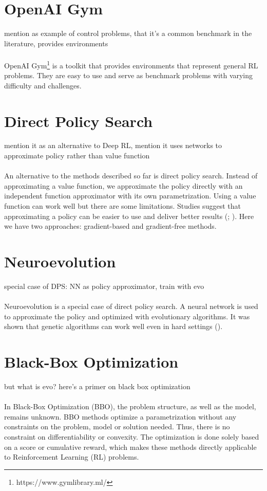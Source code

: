\section{OpenAI Gym}
\label{sec:gym}
mention as example of control problems, that it's a common benchmark in the literature, provides environments \\ \\
OpenAI Gym\footnote{https://www.gymlibrary.ml/} is a toolkit that provides environments that represent general RL problems. They are easy to use and serve as benchmark problems with varying difficulty and challenges.

\section{Direct Policy Search}
mention it as an alternative to Deep RL, mention it uses networks to approximate policy rather than value function \\ \\
An alternative to the methods described so far is direct policy search. Instead of approximating a value function, we approximate the policy directly with an independent function approximator with its own parametrization. Using a value function can work well but there are some limitations. Studies suggest that approximating a policy can be easier to use and deliver better results (\cite{sutton1999policy}; \cite{anderson2000approximating}).
Here we have two approaches: gradient-based and gradient-free methods.

\section{Neuroevolution}
special case of DPS: NN as policy approximator, train with evo \\ \\
Neuroevolution is a special case of direct policy search. A neural network is used to approximate the policy and optimized with evolutionary algorithms. It was shown that genetic algorithms can work well even in hard settings (\cite{such2017deep}).

\section{Black-Box Optimization}
but what is evo? here's a primer on black box optimization \\ \\
In Black-Box Optimization (BBO), the problem structure, as well as the model, remains unknown. BBO methods optimize a parametrization without any constraints on the problem, model or solution needed. Thus, there is no constraint on differentiability or convexity. The optimization is done solely based on a score or cumulative reward, which makes these methods directly applicable to Reinforcement Learning (RL) problems.

